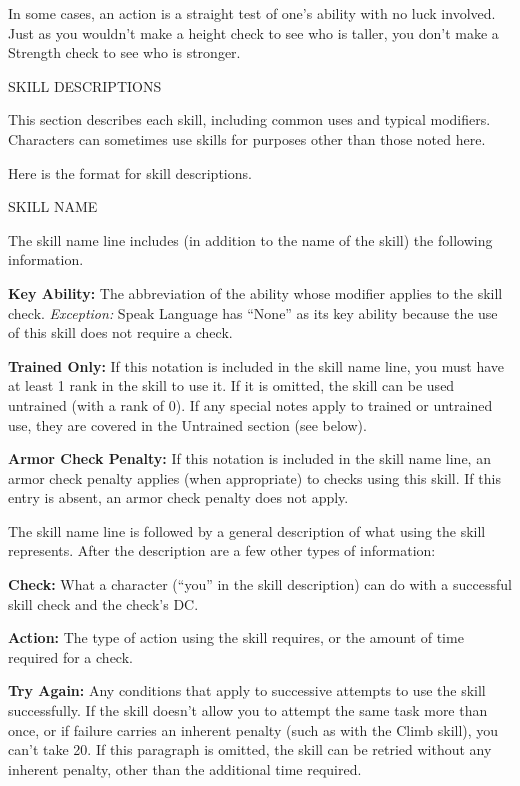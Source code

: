 \documentclass{article}
\begin{document}
In some cases, an action is a straight test of one's ability with no luck involved. 
Just as you wouldn't make a height check to see who is taller, you don't make a 
Strength check to see who is stronger.

\vspace{12pt}
{\LARGE{}SKILL DESCRIPTIONS}

This section describes each skill, including common uses and typical modifiers. 
Characters can sometimes use skills for purposes other than those noted here.

Here is the format for skill descriptions.

\vspace{12pt}
SKILL NAME

The skill name line includes (in addition to the name of the skill) the following 
information.

\textbf{Key Ability:} The abbreviation of the ability whose modifier applies to 
the skill check. \textit{Exception: }Speak Language has ``None'' as its key ability 
because the use of this skill does not require a check.

\textbf{Trained Only:} If this notation is included in the skill name line, you 
must have at least 1 rank in the skill to use it. If it is omitted, the skill can 
be used untrained (with a rank of 0). If any special notes apply to trained or 
untrained use, they are covered in the Untrained section (see below).

\textbf{Armor Check Penalty:} If this notation is included in the skill name line, 
an armor check penalty applies (when appropriate) to checks using this skill. If 
this entry is absent, an armor check penalty does not apply.

\vspace{12pt}
The skill name line is followed by a general description of what using the skill 
represents. After the description are a few other types of information:

\textbf{Check:} What a character (``you'' in the skill description) can do with 
a successful skill check and the check's DC.

\textbf{Action:} The type of action using the skill requires, or the amount of 
time required for a check.

\textbf{Try Again:} Any conditions that apply to successive attempts to use the 
skill successfully. If the skill doesn't allow you to attempt the same task more 
than once, or if failure carries an inherent penalty (such as with the Climb skill), 
you can't take 20. If this paragraph is omitted, the skill can be retried without 
any inherent penalty, other than the additional time required.
\end{document}
